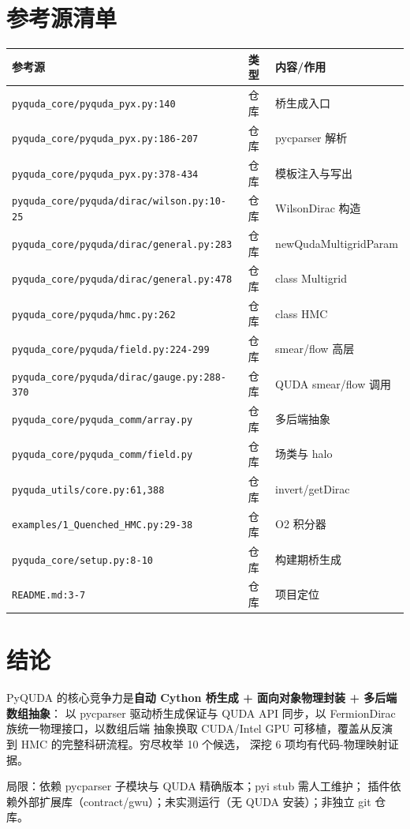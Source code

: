 \documentclass[UTF8]{ctexart}
\begin{document}
\section{参考源清单}
{\small
\begin{xltabular}{\textwidth}{XXX}
\toprule
\textcolor{evidence}{参考源} & 类型 & 内容/作用 \\
\midrule
\endhead
\texttt{\nolinkurl{pyquda_core/pyquda_pyx.py:140}} & 仓库 & 桥生成入口 \\
\texttt{\nolinkurl{pyquda_core/pyquda_pyx.py:186-207}} & 仓库 & pycparser 解析 \\
\texttt{\nolinkurl{pyquda_core/pyquda_pyx.py:378-434}} & 仓库 & 模板注入与写出 \\
\texttt{\nolinkurl{pyquda_core/pyquda/dirac/wilson.py:10-25}} & 仓库 & WilsonDirac 构造 \\
\texttt{\nolinkurl{pyquda_core/pyquda/dirac/general.py:283}} & 仓库 & newQudaMultigridParam \\
\texttt{\nolinkurl{pyquda_core/pyquda/dirac/general.py:478}} & 仓库 & class Multigrid \\
\texttt{\nolinkurl{pyquda_core/pyquda/hmc.py:262}} & 仓库 & class HMC \\
\texttt{\nolinkurl{pyquda_core/pyquda/field.py:224-299}} & 仓库 & smear/flow 高层 \\
\texttt{\nolinkurl{pyquda_core/pyquda/dirac/gauge.py:288-370}} & 仓库 & QUDA smear/flow 调用 \\
\texttt{\nolinkurl{pyquda_core/pyquda_comm/array.py}} & 仓库 & 多后端抽象 \\
\texttt{\nolinkurl{pyquda_core/pyquda_comm/field.py}} & 仓库 & 场类与 halo \\
\texttt{\nolinkurl{pyquda_utils/core.py:61,388}} & 仓库 & invert/getDirac \\
\texttt{\nolinkurl{examples/1_Quenched_HMC.py:29-38}} & 仓库 & O2 积分器 \\
\texttt{\nolinkurl{pyquda_core/setup.py:8-10}} & 仓库 & 构建期桥生成 \\
\texttt{\nolinkurl{README.md:3-7}} & 仓库 & 项目定位 \\
\bottomrule
\end{xltabular}
}

\section{结论}
\begin{conclbox}
PyQUDA 的核心竞争力是\textbf{自动 Cython 桥生成 + 面向对象物理封装 + 多后端数组抽象}：
以 pycparser 驱动桥生成保证与 QUDA API 同步，以 FermionDirac 族统一物理接口，以数组后端
抽象换取 CUDA/Intel GPU 可移植，覆盖从反演到 HMC 的完整科研流程。穷尽枚举 10 个候选，
深挖 6 项均有代码-物理映射证据。
\end{conclbox}
\begin{warnbox}
\textcolor{warn}{局限：}依赖 pycparser 子模块与 QUDA 精确版本；pyi stub 需人工维护；
插件依赖外部扩展库（contract/gwu）；未实测运行（无 QUDA 安装）；非独立 git 仓库。
\end{warnbox}
\end{document}
